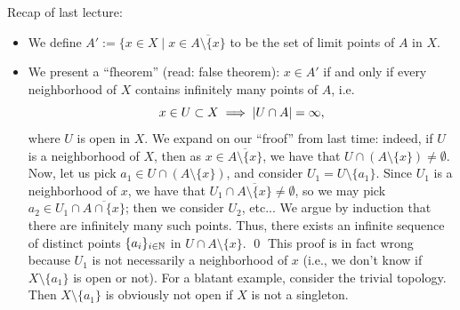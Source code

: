 \noindent Recap of last lecture:
\begin{itemize}
    \item We define $A' := \{x \in X \mid x \in \overline{A \setminus \{x\}}$ to be the set of limit points of $A$ in $X$.
    \item We present a ``fheorem'' (read: false theorem): $x \in A'$ if and only if every neighborhood of $X$ contains infinitely many points of $A$, i.e.
    \[ x \in U \subset X \implies \left\lvert U \cap A \right\rvert = \infty, \]
    where $U$ is open in $X$.
    \medskip\newline
    We expand on our ``froof'' from last time: indeed, if $U$ is a neighborhood of $X$, then as $x \in \overline{A \setminus \{x\}}$, we have that $U \cap (A \setminus \{x\}) \neq \emptyset$. Now, let us pick $a_1 \in U \cap (A \setminus \{x\})$, and consider $U_1 = U \setminus \{a_1\}$.
    \medskip\newline
    Since $U_1$ is a neighborhood of $x$, we have that $U_1 \cap \overline{A \setminus \{x\}} \neq \emptyset$, so we may pick $a_2 \in U_1 \cap \overline{A \cap \{x\}}$; then we consider $U_2$, etc... We argue by induction that there are infinitely many such points. Thus, there exists an infinite sequence of distinct points $\{a_i\}_{i \in \mathbb N}$ in $U \cap A \setminus \{x\}$. \qed
    \medskip\newline
    This proof is in fact wrong because $U_1$ is not necessarily a neighborhood of $x$ (i.e., we don't know if $X \setminus \{a_1\}$ is open or not). For a blatant example, consider the trivial topology. Then $X \setminus \{a_1\}$ is obviously not open if $X$ is not a singleton.
\end{itemize}

